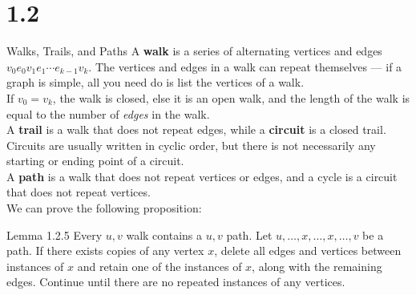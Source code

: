 \documentclass[10pt]{extarticle}
\begin{document}
\section*{1.2}%
\begin{problem}{Walks, Trails, and Paths}
  A \textbf{walk} is a series of alternating vertices and edges $v_0e_0v_1e_1\cdots e_{k-1}v_k$. The vertices and edges in a walk can repeat themselves --- if a graph is simple, all you need do is list the vertices of a walk.\\

  If $v_0 = v_k$, the walk is closed, else it is an open walk, and the length of the walk is equal to the number of \textit{edges} in the walk.\\

  A \textbf{trail} is a walk that does not repeat edges, while a \textbf{circuit} is a closed trail. Circuits are usually written in cyclic order, but there is not necessarily any starting or ending point of a circuit.\\

  A \textbf{path} is a walk that does not repeat vertices or edges, and a cycle is a circuit that does not repeat vertices.\\

  We can prove the following proposition:
  \begin{problem}{Lemma 1.2.5}
    Every $u,v$ walk contains a $u,v$ path.
    \tcblower
    Let $u,\dots,x,\dots,x,\dots,v$ be a path. If there exists copies of any vertex $x$, delete all edges and vertices between instances of $x$ and retain one of the instances of $x$, along with the remaining edges. Continue until there are no repeated instances of any vertices.
  \end{problem}
\end{problem}
\end{document}
